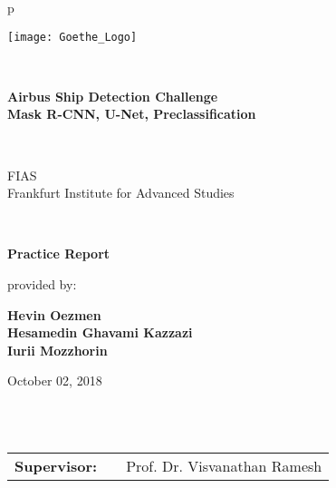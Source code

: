 \begin{center}
\begin{tabular}{p{\textwidth}}

\begin{center}
\texttt{[image: Goethe\_Logo]}
\end{center}

\\
\nocite{*}
\begin{center}
\LARGE{\textbf{Airbus Ship Detection Challenge \\
Mask R-CNN, U-Net, Preclassification}}
\end{center}

\\


\begin{center}
\large{FIAS \\
Frankfurt Institute for Advanced Studies \\}
\end{center}

\\

\begin{center}
\textbf{\Large{Practice Report}}
\end{center}


\begin{center}
provided by:
\end{center}

\begin{center}
\large{\textbf{Hevin Oezmen \\
Hesamedin Ghavami Kazzazi \\
Iurii Mozzhorin}} \\
\end{center}

\begin{center}
\large{October 02, 2018}
\end{center}

\\

\\

\begin{center}
\begin{tabular}{lll}
\textbf{Supervisor:} & & Prof. Dr. Visvanathan Ramesh\\
\end{tabular}
\end{center}

\end{tabular}
\end{center}